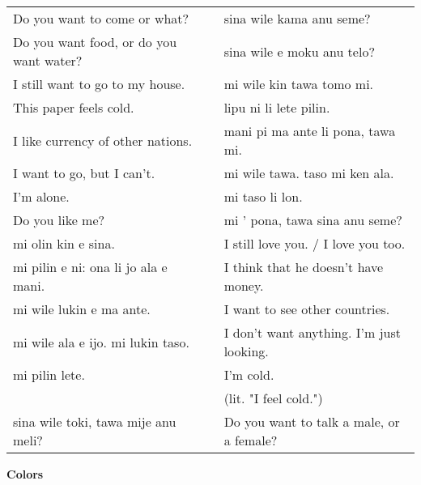 \begin{supertabular}{p{5,5cm}|ll}
Do you want to come or what?  && sina wile kama anu seme? \\ %
Do you want food, or do you want water?  && sina wile e moku anu telo? \\ %
I still want to go to my house.  && mi wile kin tawa tomo mi. \\ %
This paper feels cold.  && lipu ni li lete pilin. \\ %
I like currency of other nations.  && mani pi ma ante li pona, tawa mi. \\ %
I want to go, but I can't.  && mi wile tawa. taso mi ken ala. \\ %
I'm alone.  && mi taso li lon. \\ %
Do you like me?  && mi ' pona, tawa sina anu seme? \\ %
mi olin kin e sina.  && I still love you. / I love you too.\\
mi pilin e ni: ona li jo ala e mani.  && I think that he doesn't have money. \\
mi wile lukin e ma ante.  && I want to see other countries. \\
mi wile ala e ijo. mi lukin taso.  && I don't want anything. I'm just looking. \\
mi pilin lete.  && I'm cold. \\
 &&   (lit. "I feel cold.") \\ %
sina wile toki, tawa mije anu meli?  && Do you want to talk a male, or a female? \\
\end{supertabular} 
\newpage
\textbf{Colors} 
\label{'colors'}

